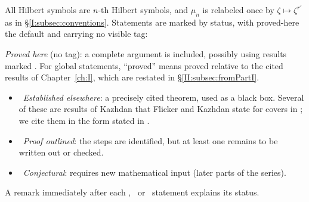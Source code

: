 All Hilbert symbols are $n$-th Hilbert symbols, and $\mu_n$ is relabeled once by $\zeta\mapsto\zeta^{r'}$ as in \S\ref{I:subsec:conventions}. Statements are marked by status, with proved-here the default and carrying no visible tag:

\emph{Proved here} (no tag): a complete argument is included, possibly using results marked \Ev. For global statements, ``proved'' means proved relative to the cited results of Chapter~\ref{ch:I}, which are restated in \S\ref{II:subsec:fromPartI}.
\begin{itemize}
\item \Ev\ \emph{Established elsewhere}: a precisely cited theorem, used as a black box. Several of these are results of Kazhdan \cite{Kaz86} that Flicker and Kazhdan state for covers in \cite{FK86}; we cite them in the form stated in \cite{FK86}.
\item \Ov\ \emph{Proof outlined}: the steps are identified, but at least one remains to be written out or checked.
\item \Cv\ \emph{Conjectural}: requires new mathematical input (later parts of the series).
\end{itemize}
A remark immediately after each \Ev, \Ov\ or \Cv\ statement explains its status.

